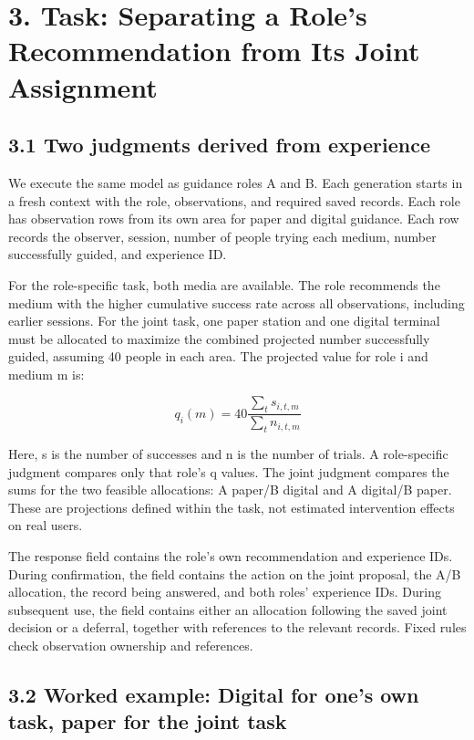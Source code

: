 \documentclass[10pt,a4paper]{article}
\begin{document}
\section{3. Task: Separating a Role's Recommendation from Its Joint Assignment}\label{paper-03-task-separating-a-roles-recommendation-from-its-joint-assignment}

\subsection{3.1 Two judgments derived from experience}\label{paper-03-two-judgments-derived-from-experience}

We execute the same model as guidance roles A and B. Each generation starts in a fresh context with the role, observations, and required saved records. Each role has observation rows from its own area for paper and digital guidance. Each row records the observer, session, number of people trying each medium, number successfully guided, and experience ID.

For the role-specific task, both media are available. The role recommends the medium with the higher cumulative success rate across all observations, including earlier sessions. For the joint task, one paper station and one digital terminal must be allocated to maximize the combined projected number successfully guided, assuming 40 people in each area. The projected value for role i and medium m is:

\[
q_i(m)=40\frac{\sum_t s_{i,t,m}}{\sum_t n_{i,t,m}}
\]

Here, s is the number of successes and n is the number of trials. A role-specific judgment compares only that role's q values. The joint judgment compares the sums for the two feasible allocations: A paper/B digital and A digital/B paper. These are projections defined within the task, not estimated intervention effects on real users.

The \texttt{} response field contains the role's own recommendation and experience IDs. During confirmation, the \texttt{} field contains the action on the joint proposal, the A/B allocation, the record being answered, and both roles' experience IDs. During subsequent use, the \texttt{} field contains either an allocation following the saved joint decision or a deferral, together with references to the relevant records. Fixed rules check observation ownership and references.

\subsection{3.2 Worked example: Digital for one's own task, paper for the joint task}\label{paper-03-worked-example-digital-for-ones-own-task-paper-for-the-joint-task}
\end{document}
